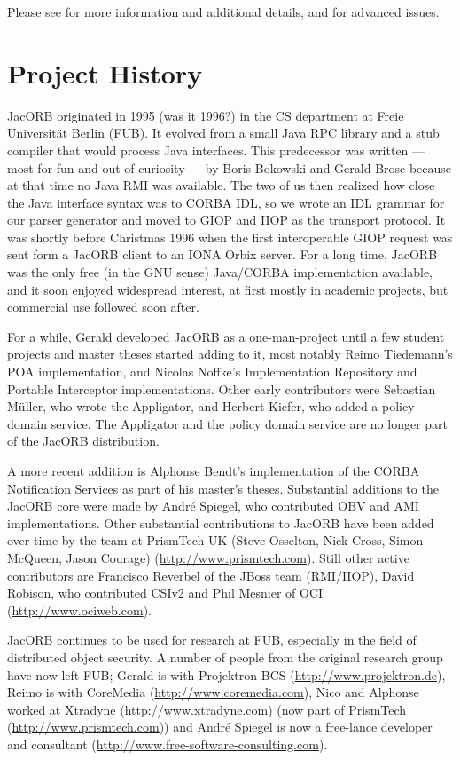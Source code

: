 Please see \cite{Brose2001a,Siegel2000, Vinoski1997} for more
information and additional details, and \cite{Henning1999} for
advanced issues.

\section{Project History}

JacORB originated in 1995 (was it 1996?) in the CS department at Freie
Universit{\"a}t Berlin (FUB). It evolved from a small Java RPC library and a
stub compiler that would process Java interfaces. This predecessor was
written --- most for fun and out of curiosity --- by Boris Bokowski
and Gerald Brose because at that time no Java RMI was available. The
two of us then realized how close the Java interface syntax was to
CORBA IDL, so we wrote an IDL grammar for our parser generator and
moved to GIOP and IIOP as the transport protocol. It was shortly
before Christmas 1996 when the first interoperable GIOP request was
sent form a JacORB client to an IONA Orbix server. For a long time,
JacORB was the only free (in the GNU sense) Java/CORBA implementation
available, and it soon enjoyed widespread interest, at first mostly in
academic projects, but commercial use followed soon after.

For a while, Gerald developed JacORB as a one-man-project until a few
student projects and master theses started adding to it, most notably
Reimo Tiedemann's POA implementation, and Nicolas Noffke's
Implementation Repository and Portable Interceptor implementations.
Other early contributors were Sebastian M{\"u}ller, who wrote the
Appligator, and Herbert Kiefer, who added a policy domain service. The
Appligator and the policy domain service are no longer part of the
JacORB distribution.

A more recent addition is Alphonse Bendt's implementation of the CORBA
Notification Services as part of his master's theses. Substantial
additions to the JacORB core were made by Andr{\'e} Spiegel, who
contributed OBV and AMI implementations. Other substantial
contributions to JacORB have been added over time by the team at
PrismTech UK (Steve Osselton, Nick Cross, Simon McQueen, Jason
Courage) (\href{http://www.prismtech.com}{http://www.prismtech.com}).
Still other active contributors are Francisco Reverbel of
the JBoss team (RMI/IIOP), David Robison, who contributed CSIv2 and
Phil Mesnier of OCI (\href{http://www.ociweb.com}{http://www.ociweb.com}).

JacORB continues to be used for research at FUB, especially in the
field of distributed object security. A number of people from the original
research group have now left FUB; Gerald is with Projektron BCS
(\href{http://www.projektron.de}{http://www.projektron.de}), Reimo is
with CoreMedia (\href{http://www.coremedia.com}{http://www.coremedia.com}),
Nico and Alphonse worked at Xtradyne (\href{http://www.xtradyne.com}
{http://www.xtradyne.com}) (now part of PrismTech
(\href{http://www.prismtech.com}{http://www.prismtech.com})) and Andr{\'e}
Spiegel is now a free-lance developer and consultant
(\href{http://www.free-software-consulting.com}
{http://www.free-software-consulting.com}).

